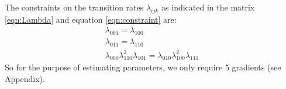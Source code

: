 \documentclass[11pt]{article}
\begin{document}
The constraints on the transition rates $\lambda_{ijk}$ as indicated
in the matrix \eqref{eqn:Lambda} and equation \eqref{eqn:constraint}
are:
\begin{equation}\label{eqn:constraints}
  \begin{array}{c}
    \lambda_{001} = \lambda_{100}\\
    \lambda_{011} = \lambda_{110}\\
    \lambda_{000}\lambda_{110}^2\lambda_{101} = \lambda_{010}\lambda_{100}^2\lambda_{111}
  \end{array}
\end{equation}
So for the purpose of estimating parameters, we only require 5
gradients (see Appendix).

\end{document}
